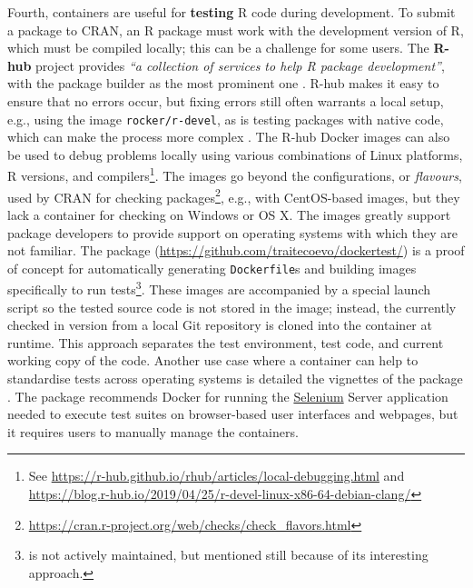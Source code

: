 Fourth, containers are useful for \textbf{testing} R code during
development. To submit a package to CRAN, an R package must work with
the development version of R, which must be compiled locally; this can
be a challenge for some users. The \textbf{R-hub} project provides
\emph{``a collection of services to help R package development''}, with
the package builder as the most prominent one \citep{r-hub_docs_2019}.
R-hub makes it easy to ensure that no errors occur, but fixing errors
still often warrants a local setup, e.g., using the image
\texttt{rocker/r-devel}, as is testing packages with native code, which
can make the process more complex \citep[cf.][]{eckert_building_2018}.
The R-hub Docker images can also be used to debug problems locally using
various combinations of Linux platforms, R versions, and
compilers\footnote{See \href{https://r-hub.github.io/rhub/articles/local-debugging.html}{https://r-hub.github.io/rhub/articles/local-debugging.html} and \href{https://blog.r-hub.io/2019/04/25/r-devel-linux-x86-64-debian-clang/}{https://blog.r-hub.io/2019/04/25/r-devel-linux-x86-64-debian-clang/}}.
The images go beyond the configurations, or \emph{flavours}, used by
CRAN for checking
packages\footnote{\href{https://cran.r-project.org/web/checks/check_flavors.html}{https://cran.r-project.org/web/checks/check\_flavors.html}},
e.g., with CentOS-based images, but they lack a container for checking
on Windows or OS X. The images greatly support package developers to
provide support on operating systems with which they are not familiar.
The package 
(\url{https://github.com/traitecoevo/dockertest/}) is a proof of concept
for automatically generating \texttt{Dockerfile}s and building images
specifically to run
tests\footnote{ is not actively maintained, but mentioned still because of its interesting approach.}.
These images are accompanied by a special launch script so the tested
source code is not stored in the image; instead, the currently checked
in version from a local Git repository is cloned into the container at
runtime. This approach separates the test environment, test code, and
current working copy of the code. \label{rselenium} Another use case
where a container can help to standardise tests across operating systems
is detailed the vignettes of the package 
\citep{rselenium_2019}. The package recommends Docker for running the
\href{https://selenium.dev/}{Selenium} Server application needed to
execute test suites on browser-based user interfaces and webpages, but
it requires users to manually manage the containers.

